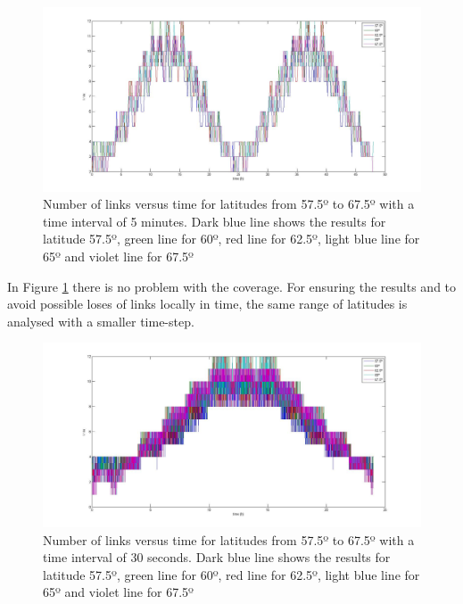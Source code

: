\begin{figure}[H]
\begin{center}
\includegraphics[scale=0.30]{575_25_675_lat.jpg}
\caption[Links vs time for latitudes from 57.5º to 67.5º]{Number of links versus time for latitudes from 57.5º to 67.5º with a time interval of 5 minutes. Dark blue line shows the results for latitude 57.5º, green line for 60º, red line for 62.5º, light blue line for 65º and violet line for 67.5º}
\label{fig:lat6}
\end{center}
\end{figure}
In Figure \ref{fig:lat6} there is no problem with the coverage. For ensuring the results and to avoid possible loses of links locally in time, the same range of latitudes is analysed with a smaller time-step.
\begin{figure}[H]
\begin{center}
\includegraphics[scale=0.30]{575_25_675_(30s)_lat.jpg}
\caption[Links vs time for latitudes from 57.5º to 67.5º reduced timestep]{Number of links versus time for latitudes from 57.5º to 67.5º with a time interval of 30 seconds. Dark blue line shows the results for latitude 57.5º, green line for 60º, red line for 62.5º, light blue line for 65º and violet line for 67.5º}
\label{fig:lat7}
\end{center}
\end{figure}

